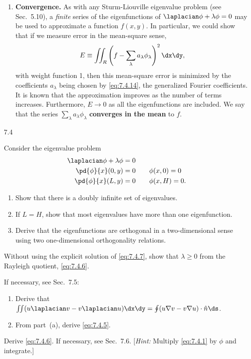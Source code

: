 \begin{enumerate}
\item[4b.] \textbf{Convergence.}  As with any Sturm-Liouville eigenvalue problem (see Sec.~5.10), a \emph{finite} series of the eigenfunctions of $\laplacian\phi + \lambda\phi = 0$ may be used to approximate a function $f(x,y)$.  In particular, we could show that if we measure error in the mean-square sense,
\begin{equation}
E \equiv \iint_R \left(f - \sum_\lambda a_\lambda \phi_\lambda\right)^2\dx\dy,
\label{eq:7.4.16}
\end{equation}
with weight function 1, then this mean-square error is minimized by the coefficients $a_\lambda$ being chosen by \eqref{eq:7.4.14}, the generalized Fourier coefficients.  It is known that the approximation improves as the number of terms increases.  Furthermore, $E \to 0$ as all the eigenfunctions are included.  We say that the series $\sum_\lambda a_\lambda\phi_\lambda$ \textbf{converges in the mean} to $f$.
\end{enumerate}

\begin{exercises}{7.4}

\item Consider the eigenvalue problem
\[
\begin{aligned}
\laplacian\phi + \lambda\phi &= 0 \\
\pd{\phi}{x}(0,y) &= 0 \qquad \phi(x,0) = 0 \\
\pd{\phi}{x}(L,y) &= 0 \qquad \phi(x,H) = 0.
\end{aligned}
\]

\begin{enumerate}
\item[\starred(a)] Show that there is a doubly infinite set of eigenvalues.
\item[(b)] If $L = H$, show that most eigenvalues have more than one eigenfunction.
\item[(c)] Derive that the eigenfunctions are orthogonal in a two-dimensional sense using two one-dimensional orthogonality relations.
\end{enumerate}

\item Without using the explicit solution of \eqref{eq:7.4.7}, show that $\lambda \geq 0$ from the Rayleigh quotient, \eqref{eq:7.4.6}.

\item If necessary, see Sec.~7.5:
\begin{enumerate}
\item[(a)] Derive that $\iint(u\laplacian v - v\laplacian u)\dx\dy = \oint(u\nabla v - v\nabla u)\cdot\hat{n}\ds$.
\item[(b)] From part~(a), derive \eqref{eq:7.4.5}.
\end{enumerate}

\item Derive \eqref{eq:7.4.6}.  If necessary, see Sec.~7.6.  [\emph{Hint:} Multiply \eqref{eq:7.4.1} by $\phi$ and integrate.]

\end{exercises}
